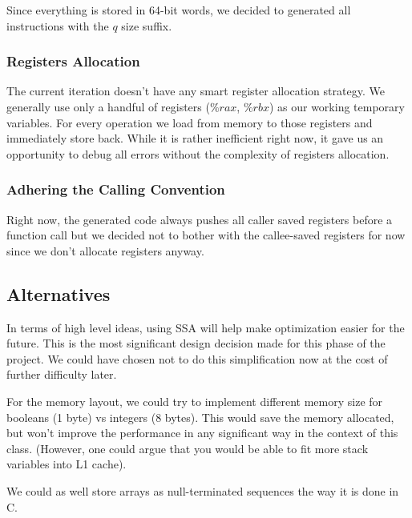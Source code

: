 \documentclass[11pt]{article}
\begin{document}
\par Since everything is stored in 64-bit words, we decided to generated all instructions with the $q$ size suffix.

\subsubsection{Registers Allocation}

\par The current iteration doesn't have any smart register allocation strategy. We generally use only a handful of registers ($\%rax$, $\%rbx$) as our working temporary variables. For every operation we load from memory to those registers and immediately store back. While it is rather inefficient right now, it gave us an opportunity to debug all errors without the complexity of registers allocation.

\subsubsection{Adhering the Calling Convention}

\par Right now, the generated code always pushes all caller saved registers before a function call but we decided not to bother with the callee-saved registers for now since we don't allocate registers anyway.

\subsection{Alternatives}

\par In terms of high level ideas, using SSA will help make optimization easier for the future. This is the most significant design decision made for this phase of the project. We could have chosen not to do this simplification now at the cost of further difficulty later.

\par For the memory layout, we could try to implement different memory size for booleans (1 byte) vs integers (8 bytes). This would save the memory allocated, but won't improve the performance in any significant way in the context of this class. (However, one could argue that you would be able to fit more stack variables into L1 cache).

\par We could as well store arrays as null-terminated sequences the way it is done in C.
\end{document}
